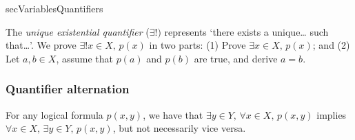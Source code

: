 \begin{tldr}{secVariablesQuantifiers}
\begin{tldrlist}
The \textit{unique existential quantifier} ($\exists !)$ represents `there exists a unique\dots{} such that\dots{}'. We prove $\exists ! x \in X,\, p(x)$ in two parts: (1) Prove $\exists x \in X,\, p(x)$; and (2) Let $a,b \in X$, assume that $p(a)$ and $p(b)$ are true, and derive $a=b$.
\end{tldrlist}

\subsubsection*{Quantifier alternation}

\begin{tldrlist}
For any logical formula $p(x,y)$, we have that $\exists y \in Y,\, \forall x \in X,\, p(x,y)$ implies $\forall x \in X,\, \exists y \in Y,\, p(x,y)$, but not necessarily vice versa.
\end{tldrlist}

\end{tldr}